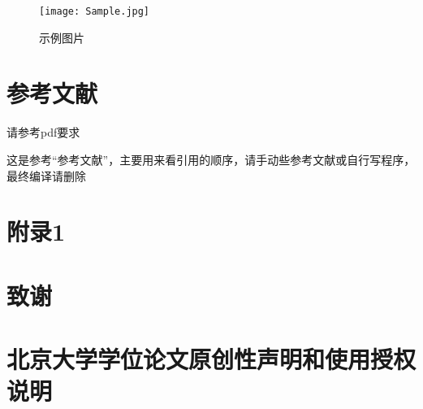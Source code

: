 \documentclass[UTF8,openany,AutoFakeBold,AutoFakeSlant,cs4size]{ctexbook}
\begin{document}
\begin{figure}[h]
\centering
\texttt{[image: Sample.jpg]}
\caption{示例图片}
\label{fig:sample}
\end{figure}
\clearpage

\small
\linespread{1}\selectfont
\chapter*{参考文献}
请参考pdf要求

{
	\fancyhf{}
	\fancyfoot[CO,CE]{~\thepage~}
	\renewcommand{\headrulewidth}{0.7pt}
	\renewcommand{\footrulewidth}{0pt}
}
\fancyhf{}
\fancyfoot[CO,CE]{~\thepage~}
\renewcommand{\headrulewidth}{0.7pt}
\renewcommand{\footrulewidth}{0pt}








这是参考“参考文献”，主要用来看引用的顺序，请手动些参考文献或自行写程序，最终编译请删除
\clearpage


\appendix
\chapter{附录1}


\linespread{1.5}\selectfont
\normalsize
\chapter*{致谢}



{
	\fancyhf{}
	\fancyfoot[CO,CE]{~\thepage~}
	\renewcommand{\headrulewidth}{0.7pt}
	\renewcommand{\footrulewidth}{0pt}
}
\fancyhf{}
\fancyfoot[CO,CE]{~\thepage~}
\renewcommand{\headrulewidth}{0.7pt}
\renewcommand{\footrulewidth}{0pt}




{\linespread{1}\selectfont
\normalsize
\chapter*{北京大学学位论文原创性声明和使用授权说明}}
\end{document}

